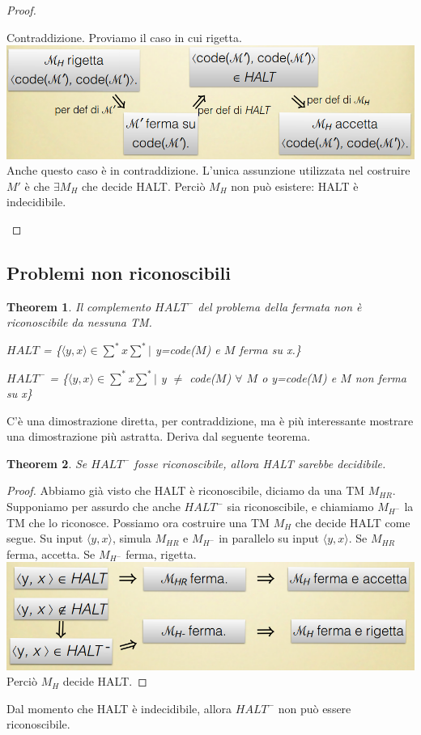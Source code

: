 \documentclass[a4paper, 12pt]{article}
\newtheorem{theorem}{Theorem}[section]
\begin{document}
\begin{proof}
\begin{enumerate}
Contraddizione. Proviamo il caso in cui rigetta.\\
\includegraphics[scale=0.4]{HALT5.png}\\
Anche questo caso \`e in contraddizione. L'unica assunzione utilizzata nel costruire $M'$ \`e che $\exists M_H$ che decide HALT. Perci\`o $M_H$ non pu\`o esistere: HALT \`e indecidibile.
\end{enumerate}
\end{proof}

\subsection{Problemi non riconoscibili}
\begin{theorem}
Il complemento $HALT^{-}$ del problema della fermata non \`e riconoscibile da nessuna TM.
\begin{center}
$HALT$ = \{$\langle y,x \rangle \in \sum^{*}x\sum^{*}|$ y=code($M$) e $M$ ferma su x.\}
\end{center}
\begin{center}
$HALT^{-}$ = \{$\langle y,x \rangle \in \sum^{*}$x$\sum^{*}|$ y $\neq$ code($M$) $\forall$ $M$ o y=code($M$) e $M$ non ferma su x\}
\end{center}
\end{theorem}
C'\`e una dimostrazione diretta, per contraddizione, ma \`e pi\`u interessante mostrare una dimostrazione pi\`u astratta. Deriva dal seguente teorema.
\begin{theorem}
Se $HALT^{-}$ fosse riconoscibile, allora HALT sarebbe decidibile.
\end{theorem}
\begin{proof}
Abbiamo gi\`a visto che HALT \`e riconoscibile, diciamo da una TM $M_{HR}$. Supponiamo per assurdo che anche $HALT^{-}$ sia riconoscibile, e chiamiamo $M_{H^{-}}$ la TM che lo riconosce. Possiamo ora costruire una TM $M_H$ che decide HALT come segue. Su input $\langle y,x \rangle$, simula $M_{HR}$ e $M_{H^{-}}$ in parallelo su input $\langle y,x \rangle$. Se $M_{HR}$ ferma, accetta. Se $M_{H^{-}}$ ferma, rigetta.\\
\includegraphics[scale=0.4]{TM_complemento_HALT.png}\\
Perci\`o $M_H$ decide HALT.
\end{proof}
Dal momento che HALT \`e indecidibile, allora $HALT^-$ non pu\`o essere riconoscibile.
\end{document}
